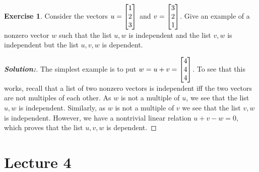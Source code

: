 \documentclass[a4paper]{amsart}
\theoremstyle{definition}
\newtheorem{exercise}{Exercise}
\newenvironment{solution}{\begin{proof}[\textbf{Solution:}] \vphantom{u}}{\end{proof}}
\begin{document}
\begin{exercise}\label{ex-independent-ii}
 Consider the vectors $u=\left[\begin{matrix} 1\\2\\3\end{matrix}\right]$ and $v=\left[\begin{matrix} 3\\2\\1\end{matrix}\right]$.
 Give an example of a nonzero vector $w$ such that the list $u,w$ is
 independent and the list $v,w$ is independent but the list $u,v,w$ is
 dependent. 
\end{exercise}
\begin{solution}
 The simplest example is to put $w=u+v=\left[\begin{matrix} 4\\4\\4\end{matrix}\right]$.  To see that
 this works, recall that a list of two nonzero vectors is independent
 iff the two vectors are not multiples of each other.  As $w$ is not a
 multiple of $u$, we see that the list $u,w$ is independent.
 Similarly, as $w$ is not a multiple of $v$ we see that the list $v,w$
 is independent.  However, we have a nontrivial linear relation
 $u+v-w=0$, which proves that the list $u,v,w$ is dependent.
\end{solution}


\section{Lecture 4}
\end{document}
